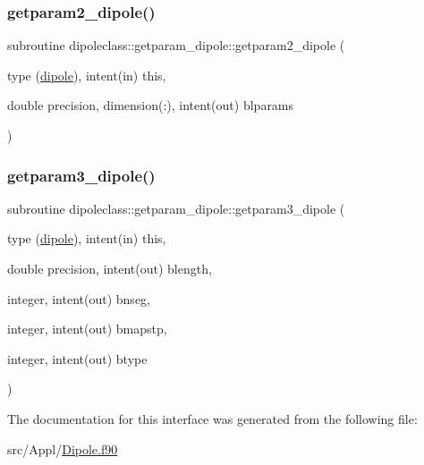 \mbox{\label{interfacedipoleclass_1_1getparam__dipole_ae4a9ad472e55e0aa869dd301c8c16b5e}} 
\subsubsection{\texorpdfstring{getparam2\_dipole()}{getparam2\_dipole()}}
{\footnotesize\ttfamily subroutine dipoleclass\+::getparam\+\_\+dipole\+::getparam2\+\_\+dipole (\begin{DoxyParamCaption}\item[{type (\mbox{\hyperlink{namespacedipoleclass_structdipoleclass_1_1dipole}{dipole}}), intent(in)}]{this,  }\item[{double precision, dimension(\+:), intent(out)}]{blparams }\end{DoxyParamCaption})}

\mbox{\label{interfacedipoleclass_1_1getparam__dipole_a4411e302e38a13c7d652369f54ca1ac9}} 
\subsubsection{\texorpdfstring{getparam3\_dipole()}{getparam3\_dipole()}}
{\footnotesize\ttfamily subroutine dipoleclass\+::getparam\+\_\+dipole\+::getparam3\+\_\+dipole (\begin{DoxyParamCaption}\item[{type (\mbox{\hyperlink{namespacedipoleclass_structdipoleclass_1_1dipole}{dipole}}), intent(in)}]{this,  }\item[{double precision, intent(out)}]{blength,  }\item[{integer, intent(out)}]{bnseg,  }\item[{integer, intent(out)}]{bmapstp,  }\item[{integer, intent(out)}]{btype }\end{DoxyParamCaption})}



The documentation for this interface was generated from the following file\+:\begin{DoxyCompactItemize}
\item 
src/\+Appl/\mbox{\hyperlink{_dipole_8f90}{Dipole.\+f90}}\end{DoxyCompactItemize}
